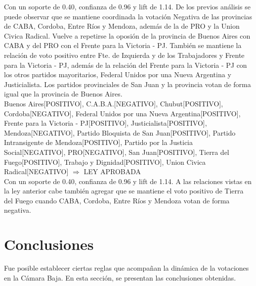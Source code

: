 \documentclass{endm}
\begin{document}
Con un soporte de 0.40, confianza de 0.96 y lift de 1.14. De los previos análisis se puede observar que se mantiene coordinada la votación Negativa de las provincias de CABA, Cordoba, Entre Ríos y Mendoza, además de la de PRO y la Union Civica Radical. Vuelve a repetirse la oposión de la provincia de Buenos Aires con CABA y del PRO con el Frente para la Victoria - PJ. También se mantiene la relación de voto positivo entre Fte. de Izquierda y de los Trabajadores y Frente para la Victoria - PJ, además de la relación del Frente para la Victoria - PJ con los otros partidos mayoritarios, Federal Unidos por una Nueva Argentina y Justicialista. Los partidos provinciales de San Juan y la provincia votan de forma igual que la provincia de Buenos Aires. \\

{Buenos Aires[POSITIVO],
C.A.B.A.[NEGATIVO], 
Chubut[POSITIVO], 
Cordoba[NEGATIVO], 
Federal Unidos por una Nueva Argentina[POSITIVO],
Frente para la Victoria - PJ[POSITIVO], 
Justicialista[POSITIVO],
Mendoza[NEGATIVO], 
Partido Bloquista de San Juan[POSITIVO],
Partido Intransigente de Mendoza[POSITIVO],
Partido por la Justicia Social[NEGATIVO],
PRO[NEGATIVO],              
San Juan[POSITIVO],  
Tierra del Fuego[POSITIVO], 
Trabajo y Dignidad[POSITIVO],  
Union Civica Radical[NEGATIVO]}     $\Longrightarrow$ {LEY APROBADA} \\

Con un soporte de 0.40, confianza de 0.96 y lift de 1.14. A las relaciones vistas en la ley anterior cabe también agregar que se mantiene el voto positivo de Tierra del Fuego cuando CABA, Cordoba, Entre Ríos y Mendoza votan de forma negativa. \\

\newpage 

\section{Conclusiones}
Fue posible establecer ciertas reglas que acompañan la dinámica de la votaciones en la Cámara Baja.
En esta sección, se presentan las conclusiones obtenidas.
\end{document}
